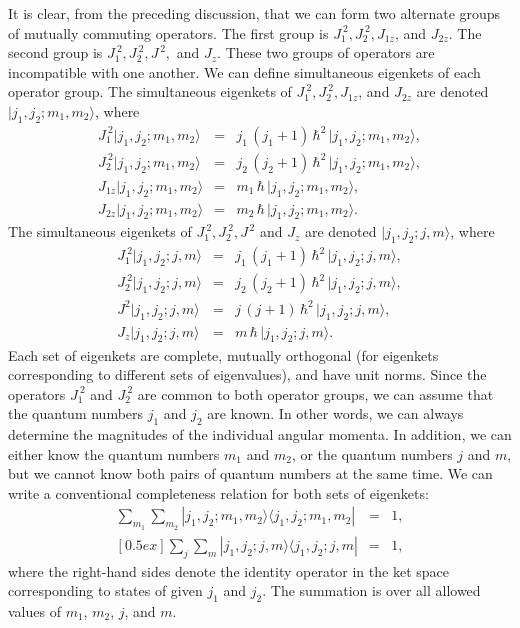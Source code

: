It is clear, from the preceding discussion, that we can form two alternate groups
of mutually commuting operators. The first group
is $J_1^{~2}, J_2^{~2}, J_{1z}$, and
$J_{2z}$. The second group is $J_1^{~2}, J_2^{~2}, J^{\,2},$ and $J_z$. These two
groups of operators are incompatible with one another.  We can define simultaneous 
eigenkets of each operator group. The simultaneous eigenkets of
$J_1^{~2}, J_2^{~2}, J_{1z}$, and
$J_{2z}$ are denoted $|j_1,j_2; m_1,m_2\rangle$, where
\begin{eqnarray}
J_1^{~2} |j_1,j_2; m_1,m_2\rangle &=& j_1\,(j_1+1)\,\hbar^2\,|j_1,j_2; m_1,m_2\rangle,
\\[0.5ex]
J_2^{~2} |j_1,j_2; m_1,m_2\rangle &=& j_2\,(j_2+1)\,\hbar^2\,|j_1,j_2; m_1,m_2\rangle,
\\[0.5ex]
J_{1z} |j_1,j_2; m_1,m_2\rangle &=& m_1\,\hbar\,|j_1,j_2; m_1,m_2\rangle,
\\[0.5ex]
J_{2z} |j_1,j_2; m_1,m_2\rangle &=& m_2\,\hbar\,|j_1,j_2; m_1,m_2\rangle.
\end{eqnarray}
The simultaneous eigenkets of
$J_1^{~2}, J_2^{~2}, J^{\,2}$ and $J_z$ are denoted 
$|j_1, j_2; j, m\rangle$, where 
\begin{eqnarray}
J_1^{~2} |j_1,j_2; j,m\rangle &=& j_1\,(j_1+1)\,\hbar^2\,|j_1,j_2; j,m\rangle,
\\[0.5ex]
J_2^{~2} |j_1,j_2; j,m\rangle &=& j_2\,(j_2+1)\,\hbar^2\,|j_1,j_2; j,m\rangle,
\\[0.5ex]
J^2 |j_1,j_2; j,m\rangle &=& j\,(j+1)\,\hbar^2\,|j_1,j_2; j,m\rangle,
\\[0.5ex]
J_{z} |j_1,j_2; j,m\rangle &=& m\,\hbar\,|j_1,j_2; j,m\rangle.
\end{eqnarray}
Each set of eigenkets are complete, mutually orthogonal (for eigenkets corresponding
to different sets of eigenvalues), and have unit norms. Since the operators
$J_1^{~2}$ and $J_2^{~2}$ are common to both  operator groups, we can  assume
that the quantum numbers $j_1$ and $j_2$ are known. In other words, we 
can always determine
 the magnitudes of the individual angular momenta. In addition, we can either
know the quantum numbers $m_1$ and $m_2$, or the quantum numbers $j$ and
$m$, but we cannot know both pairs of quantum numbers at the same time. 
We can write a conventional completeness relation for both sets of
eigenkets:
\begin{eqnarray}\label{e5.212a}
\sum_{m_1}\sum_{m_2 }|j_1,j_2; m_1, m_2\rangle \langle j_1,j_2; m_1, m_2|& =&1,\\
[0.5ex]
\sum_{j}\sum_{m} |j_1,j_2; j, m\rangle \langle j_1,j_2; j, m|& =&1,
\end{eqnarray}
where the right-hand sides denote  the identity operator in the ket space corresponding
to states of given $j_1$ and $j_2$. The summation is over all allowed values
of $m_1$, $m_2$, $j$, and $m$.

